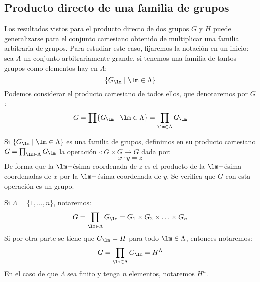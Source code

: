 \subsection{Producto directo de una familia de grupos}
Los resultados vistos para el producto directo de dos grupos $G$ y $H$ puede generalizarse para el conjunto cartesiano obtenido de multiplicar una familia arbitraria de grupos. Para estudiar este caso, fijaremos la notación en un inicio: sea $\Lambda$ un conjunto arbitrariamente grande, si tenemos una familia de tantos grupos como elementos hay en $\Lambda$:
\begin{equation*}
    \{G_\lm \mid \lm \in \Lambda\}
\end{equation*}
Podemos considerar el producto cartesiano de todos ellos, que denotaremos por $G$:
\begin{equation*}
    G = \prod \{G_\lm \mid \lm \in \Lambda\} = \prod_{\lm \in \Lambda} G_\lm
\end{equation*}

\begin{prop}
    Si $\{G_\lm \mid \lm \in \Lambda\}$ es una familia de grupos, definimos en su producto cartesiano $G = \prod_{\lm\in \Lambda}G_\lm$ la operación $\cdot :G\times G\to G$ dada por:
    \begin{equation*}
        x\cdot y = z
    \end{equation*}
    De forma que la $\lm-$ésima coordenada de $z$ es el producto de la $\lm-$ésima coordenadas de $x$ por la $\lm-$ésima coordenada de $y$. Se verifica que $G$ con esta operación es un grupo.
\end{prop}

\begin{notacion}
    Si $\Lambda = \{1,\ldots,n\}$, notaremos:
    \begin{equation*}
        G = \prod_{\lm \in \Lambda}G_\lm = G_1\times G_2 \times \ldots \times G_n
    \end{equation*}
    Si por otra parte se tiene que $G_\lm = H$ para todo $\lm\in \Lambda$, entonces notaremos:
    \begin{equation*}
        G = \prod_{\lm \in \Lambda}G_\lm = H^\Lambda 
    \end{equation*}
    En el caso de que $\Lambda$ sea finito y tenga $n$ elementos, notaremos $H^n$.
\end{notacion}

